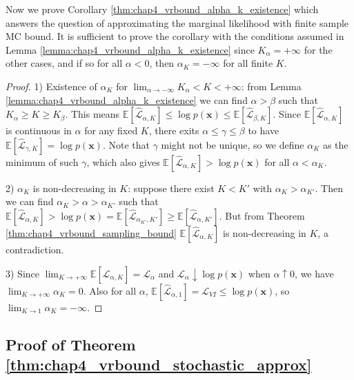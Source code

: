 
Now we prove Corollary \ref{thm:chap4_vrbound_alpha_k_existence} which answers the question of approximating the marginal likelihood with finite sample MC bound. 
It is sufficient to prove the corollary with the conditions assumed in Lemma \ref{lemma:chap4_vrbound_alpha_k_existence} since $K_{\alpha} = +\infty$ for the other cases, and if so for all $\alpha < 0$, then $\alpha_K = -\infty$ for all finite $K$.
\begin{proof}
 
1) Existence of $\alpha_K$ for $\lim_{\alpha \rightarrow -\infty} K_{\alpha} < K < +\infty$: from Lemma \ref{lemma:chap4_vrbound_alpha_k_existence} we can find $\alpha > \beta$ such that $K_{\alpha} \geq K \geq K_{\beta}$. This means  $\mathbb{E}[\hat{\mathcal{L}}_{\alpha, K}] \leq \log p(\bm{x}) \leq \mathbb{E}[\hat{\mathcal{L}}_{\beta, K}]$. Since $\mathbb{E}[\hat{\mathcal{L}}_{\alpha, K}]$ is continuous in $\alpha$ for any fixed $K$, there exits $\alpha \leq \gamma \leq \beta$ to have $\mathbb{E}[\hat{\mathcal{L}}_{\gamma, K}] = \log p(\bm{x})$. Note that $\gamma$ might not be unique, so we define $\alpha_K$ as the minimum of such $\gamma$, which also gives $\mathbb{E} [ \hat{\mathcal{L}}_{\alpha, K} ] > \log p(\bm{x})$ for all $\alpha < \alpha_K$.

2) $\alpha_K$ is non-decreasing in $K$: suppose there exist $K < K'$ with $\alpha_K > \alpha_{K'}$. Then we can find $\alpha_K > \alpha > \alpha_{K'}$ such that $\mathbb{E}[\hat{\mathcal{L}}_{\alpha, K}] > \log p(\bm{x}) = \mathbb{E}[\hat{\mathcal{L}}_{\alpha_{K'}, K'}] \geq \mathbb{E}[\hat{\mathcal{L}}_{\alpha, K'}]$. But from Theorem \ref{thm:chap4_vrbound_sampling_bound} $\mathbb{E}[\hat{\mathcal{L}}_{\alpha, K}]$ is non-decreasing in $K$, a contradiction.

3) Since $\lim_{K \rightarrow +\infty} \mathbb{E}[\hat{\mathcal{L}}_{\alpha, K}] = \mathcal{L}_{\alpha}$ and $\mathcal{L}_{\alpha} \downarrow \log p(\bm{x})$ when $\alpha \uparrow 0$, we have $\lim_{K \rightarrow +\infty} \alpha_K = 0$. Also for all $\alpha$, $\mathbb{E}[\hat{\mathcal{L}}_{\alpha, 1}] = \mathcal{L}_{VI} \leq \log p(\bm{x})$, so $\lim_{K \rightarrow 1} \alpha_K = -\infty$.
 
\end{proof}

\subsection{Proof of Theorem \ref{thm:chap4_vrbound_stochastic_approx}}

